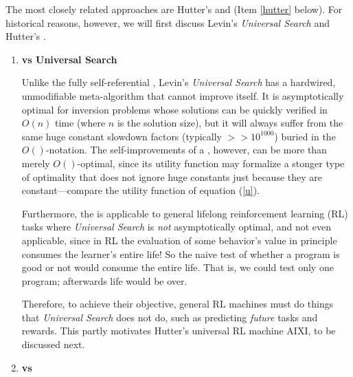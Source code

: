 The most closely related approaches are Hutter's
\hs and \tl (Item \ref{hutter} below).
For historical reasons, however, we will first discuss
Levin's {\em Universal Search} and  Hutter's \Aixin.
\begin{enumerate}

\item{\bf \GM vs Universal Search}
\label{gmvsls}

Unlike the fully self-referential \gmn, 
Levin's {\em Universal Search} \cite{Levin:73,Levin:84}
has a hardwired, unmodifiable meta-algorithm that cannot improve itself. It
is asymptotically optimal for inversion problems whose solutions can be quickly
verified in $O(n)$ time (where $n$ is the solution size), but it will always
suffer from the same huge constant slowdown factors (typically $>> 10^{1000}$)
buried in the $O()$-notation. The self-improvements of a \gmn,
however, can be more than merely $O()$-optimal, since its utility function
may formalize a stonger type of optimality that does not ignore huge
constants just because they are constant---compare the utility
function of equation (\ref{u}).

Furthermore, the \gm is applicable to 
general lifelong reinforcement learning (RL) tasks \cite{Kaelbling:96}
where {\em Universal Search} is {\em not} asymptotically optimal,
and not even applicable, since
in RL the evaluation of 
some behavior's value in principle consumes the learner's entire life!
So the naive test of whether a program is good or not
would consume the entire life. That is, we could test
only one program; afterwards life would be over.

Therefore, to achieve their objective, general RL machines 
must do things that {\em Universal Search} does
not do, such as predicting {\em future} tasks and rewards.
This partly motivates Hutter's universal RL machine AIXI, to be
discussed next.
\\

\item{\bf \GM vs \Aixi}
\label{aixi}


\end{enumerate}

